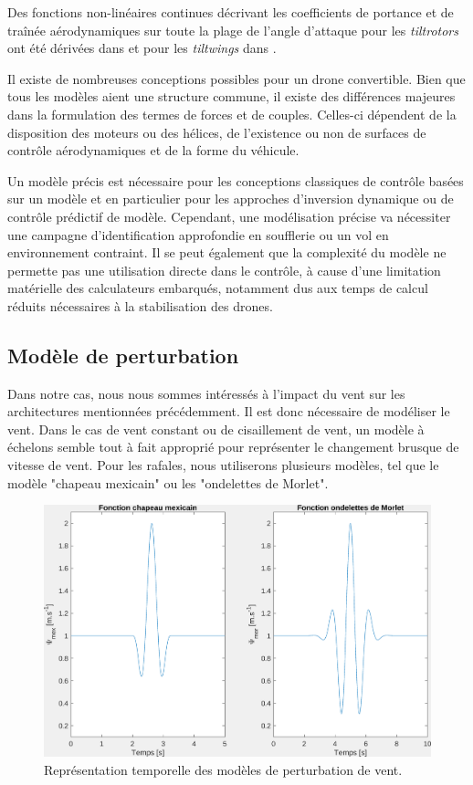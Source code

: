 Des fonctions non-linéaires continues décrivant les coefficients de portance et de traînée aérodynamiques sur toute la plage de l'angle d'attaque pour les  \textit{tiltrotors} ont été dérivées dans \cite{6981467} et pour les \textit{tiltwings} dans \cite{Lustosa2017LaP, lustosaHal-03035938}.

Il existe de nombreuses conceptions possibles pour un drone convertible. Bien que tous les modèles aient une structure commune, il existe des différences majeures dans la formulation des termes de forces et de couples. Celles-ci dépendent de la disposition des moteurs ou des hélices, de l'existence ou non de surfaces de contrôle aérodynamiques et de la forme du véhicule.

Un modèle précis est nécessaire pour les conceptions classiques de contrôle basées sur un modèle et en particulier pour les approches d'inversion dynamique ou de contrôle prédictif de modèle. Cependant, une modélisation précise va nécessiter une campagne d'identification approfondie en soufflerie ou un vol en environnement contraint. Il se peut également que la complexité du modèle ne permette pas une utilisation directe dans le contrôle, à cause d'une limitation matérielle des calculateurs embarqués, notamment dus aux temps de calcul réduits nécessaires à la stabilisation des drones.

\subsection{Modèle de perturbation}
\label{sec:perturbation}
Dans notre cas, nous nous sommes intéressés à l'impact du vent sur les architectures mentionnées précédemment. Il est donc nécessaire de modéliser le vent. Dans le cas de vent constant ou de cisaillement de vent, un modèle à échelons semble tout à fait approprié pour représenter le changement brusque de vitesse de vent. 
Pour les rafales, nous utiliserons plusieurs modèles, tel que le modèle "chapeau mexicain" ou les "ondelettes de Morlet".
\begin{figure}[ht!]
    \centerline{
    \includegraphics[trim=0cm 0cm 0cm 0cm,clip,width=0.9\columnwidth]{figures/mex_hat_morlet.png}}
    \caption{Représentation temporelle des modèles de perturbation de vent.}
    \label{fig:mexhat}
\end{figure} 

